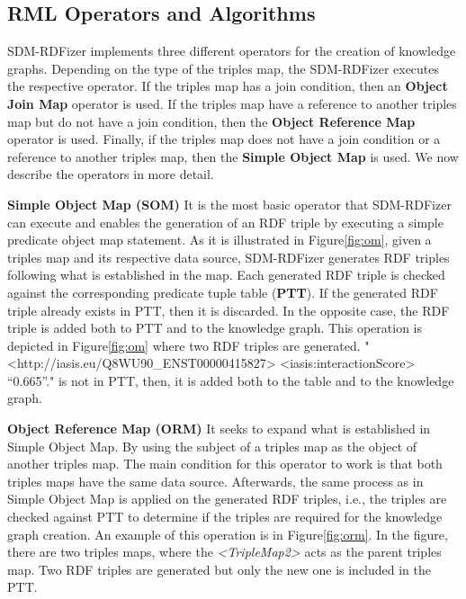 \subsection{RML Operators and Algorithms}
\label{operators}
SDM-RDFizer implements three different operators for the creation of knowledge graphs. Depending on the type of the triples map, the SDM-RDFizer executes the respective operator. If the triples map has a join condition, then an \textbf{Object Join Map} operator is used. If the triples map have a reference to another triples map but do not have a join condition, then the \textbf{Object Reference Map} operator is used. Finally, if the triples map does not have a join condition or a reference to another triples map, then the \textbf{Simple Object Map} is used. We now describe the operators in more detail.

\noindent\textbf{Simple Object Map (SOM)}
 It is the most basic operator that SDM-RDFizer can execute and enables the generation of an RDF triple by executing a simple predicate object map statement. As it is illustrated in Figure\autoref{fig:om}, given a triples map and its respective data source, SDM-RDFizer generates RDF triples following what is established in the map. Each generated RDF triple is checked against the corresponding predicate tuple table (\textbf{PTT}). If the generated RDF triple already exists in PTT, then it is discarded. In the opposite case, the RDF triple is added both to PTT and to the knowledge graph. This operation is depicted in Figure\autoref{fig:om} where two RDF triples are generated. "<http://iasis.eu/Q8WU90\_ENST00000415827> <iasis:interactionScore> “0.665”." is not in PTT, then, it is added both to the table and to the knowledge graph.  

\noindent\textbf{Object Reference Map (ORM)}
It seeks to expand what is established in Simple Object Map. By using the subject of a triples map as the object of another triples map. The main condition for this operator to work is that both triples maps have the same data source. Afterwards, the same process as in Simple Object Map is applied on the generated RDF triples, i.e., the triples are checked against PTT to determine if the triples are required for the knowledge graph creation. An example of this operation is in Figure\autoref{fig:orm}. In the figure, there are two triples maps, where the \textit{<TripleMap2>} acts as the parent triples map. Two RDF triples are generated but only the new one is included in the PTT. 

